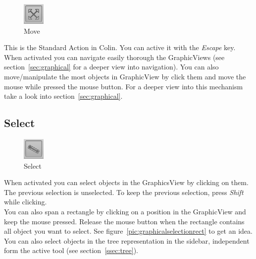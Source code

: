 \documentclass[a4paper,11pt]{report}
\begin{document}
\begin{minipage}[h]{4cm}
\begin{figure}[H]
\begin{center}
\includegraphics[scale=0.6]{./pictures/movetoolbar.png}
\caption{Move}
\label{pic:movetoolbar}
\end{center}
\end{figure}
\end{minipage}
\begin{minipage}[h]{\textwidth-4cm}
This is the Standard Action in Colin. You can active it with the \textit{Escape} key. When activated you can navigate easily thorough the GraphicViews (see section~\ref{sec:graphical} for a deeper view into navigation). 
You can also move/manipulate the most objects in GraphicView by click them and move the mouse while pressed the mouse button. For a deeper view into this mechanism take a look into section~\ref{sec:graphical}.
\end{minipage}

\subsection{Select}

\begin{minipage}[h]{4cm}
\begin{figure}[H]
\begin{center}
\includegraphics[scale=0.6]{./pictures/selecttoolbar.png}
\caption{Select}
\label{pic:selecttoolbar}
\end{center}
\end{figure}
\end{minipage}
\begin{minipage}[h]{\textwidth-4cm}
When activated you can select objects in the GraphicsView by clicking on them. The previous selection is unselected. To keep the previous selection, press \textit{Shift} while clicking.\\
You can also span a rectangle by clicking on a position in the GraphicView and keep the mouse pressed. Release the mouse button when the rectangle contains all object you want to select. See figure~\ref{pic:graphicalselectionrect} to get an idea. You can also select objects in the tree representation in the sidebar, independent form the active tool (see section~\ref{ssec:tree}).
\end{minipage}
\end{document}

